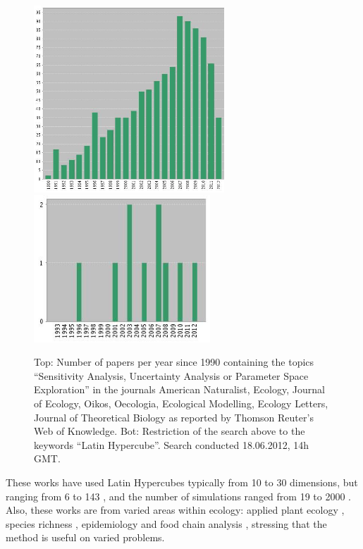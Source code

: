 \begin{figure}[htpb]
		\begin{center}
				\includegraphics[width=270px]{fig/wok.png}
				\includegraphics[width=250px]{fig/lhs.png}
		\end{center}
		\caption{Top: Number of papers per year since 1990 
		containing the topics ``Sensitivity 
		Analysis, Uncertainty Analysis or Parameter Space Exploration'' 
		in the journals American Naturalist, Ecology, Journal of 
		Ecology, Oikos, Oecologia, Ecological Modelling, 
		Ecology Letters, Journal of Theoretical Biology as reported by
		Thomson Reuter's Web of Knowledge.
		Bot: Restriction of the search above to the keywords ``Latin
		Hypercube''.
		Search conducted 18.06.2012,
		14h GMT.}
		\label{fig:wok}
\end{figure}

These works have used Latin Hypercubes typically from 10 to 30 dimensions,
but ranging from 6 to 143 \cite{Berthaume12},
and the number of
simulations ranged from 19 \cite{Nathan01} to 2000 \cite{Tiemeyer07}. 
Also, these works are from varied areas within ecology: applied plant 
ecology \cite{Confalonieri10, Tiemeyer07}, species richness 
\cite{Hamilton10}, epidemiology \cite{Shirley03} and food chain analysis
\cite{Duchesne03}, stressing that the method is useful on varied 
problems.
